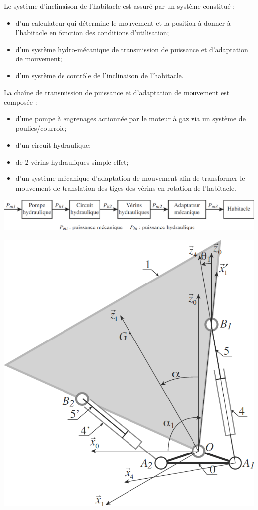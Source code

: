 \documentclass[10pt,fleqn]{article} %
\begin{document}
\begin{multicols}{2}
Le système d’inclinaison de l’habitacle est assuré par un système constitué :
\begin{itemize}
\item d’un calculateur qui détermine le mouvement et la position à donner à l’habitacle en fonction des conditions
d’utilisation;
\item d’un système hydro-mécanique de transmission de puissance et d’adaptation de mouvement;
\item d’un système de contrôle de l’inclinaison de l’habitacle.
\end{itemize}

La chaîne de transmission de puissance et d’adaptation de mouvement est composée :
\begin{itemize}
\item d’une pompe à engrenages actionnée par le moteur à gaz via un système de poulies/courroie;
\item d’un circuit hydraulique;
\item de 2 vérins hydrauliques simple effet;
\item d’un système mécanique d’adaptation de mouvement afin de transformer le mouvement de translation des tiges des vérins en rotation de l’habitacle.
\end{itemize}


\begin{center}
\includegraphics[width=\linewidth]{images/fig_03}
\end{center}

\begin{center}
\includegraphics[width=.7\linewidth]{images/fig_04}
\end{center}



\end{multicols}
\end{document}
